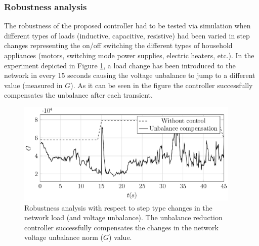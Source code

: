             

      \subsubsection{Robustness analysis}\label{VUB:sec:Robustness}

            The robustness of the proposed controller had to be tested via simulation when different types of loads (inductive, capacitive, resistive) had been varied in step changes representing the on/off switching the different types of household appliances (motors, switching mode power supplies, electric heaters, etc.). In the experiment depicted in Figure \ref{fig:robustness}, a load change has been introduced to the network in every 15 seconds causing the voltage unbalance to jump to a different value (measured in $G$). As it can be seen in the figure the controller successfully compensates the unbalance after each transient.

              \begin{figure}[ht]
            \centering
            \includegraphics[width=0.95\textwidth]{Unblance_EPS_Pics/UnbalRedComp_JCP-figure5.eps}
            \caption{Robustness analysis with respect to step type changes in the network load (and voltage unbalance). The unbalance reduction controller successfully compensates the changes in the network voltage unbalance norm ($G$) value.}
            \label{fig:robustness}
            \end{figure}

            \subsubsection{}\label{VUB:sec:Measurement}

